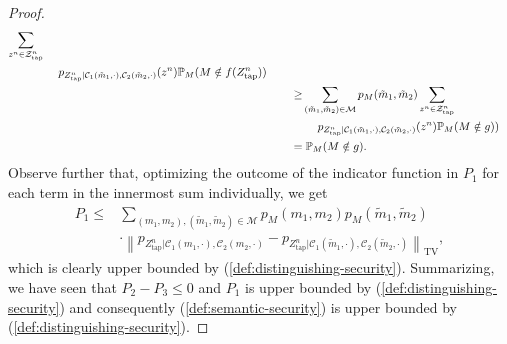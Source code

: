 \documentclass[journal]{IEEEtran}
\newcommand{\codebookpmf}{p}
\newcommand{\channelOut}{Z}
\newcommand{\channelOutAlph}{\mathcal{Z}}
\newcommand{\channelOutAlphElement}{z}
\newcommand{\channelOutAlphWiretapper}{\channelOutAlph_\mathrm{tap}}
\newcommand{\channelOutAlphElementWiretapper}{\channelOutAlphElement}
\newcommand{\channelOutWiretapper}{\channelOut_\mathrm{tap}}
\newcommand{\codebookOne}{\mathcal{C}_1}
\newcommand{\codebookTwo}{\mathcal{C}_2}
\newcommand{\codebookBlocklength}{n}
\newcommand{\totalvariationlr}[1]{\left\lVert #1 \right\rVert_\mathrm{TV}}
\newcommand{\Probability}{\mathbb{P}}
\newcommand{\messageRV}{M}
\newcommand{\messageAlphabet}{\mathcal{M}}
\newcommand{\messageAlphabetElement}{m}
\newcommand{\wiretapperDecoder}{{f}}
\newcommand{\wiretapperGuesser}{{g}}
\newcommand{\semanticTotvarTerm}{{P_1}}
\newcommand{\semanticErrorTermOne}{{P_2}}
\newcommand{\semanticErrorTermTwo}{{P_3}}
\begin{document}
\begin{proof}
\begin{align*}
\begin{aligned}
  \sum\limits_{\channelOutAlphElementWiretapper^\codebookBlocklength \in \channelOutAlphWiretapper^\codebookBlocklength}
  \\
    &~~~~\codebookpmf_{\channelOutWiretapper^\codebookBlocklength | \codebookOne(\tilde{\messageAlphabetElement}_1, \cdot), \codebookTwo(\tilde{\messageAlphabetElement}_2, \cdot)}(\channelOutAlphElementWiretapper^\codebookBlocklength)
    \Probability_\messageRV(\messageRV \notin \wiretapperDecoder(\channelOutWiretapper^\codebookBlocklength))
\end{aligned}
\\
&
\begin{aligned}
\hphantom{\semanticErrorTermTwo}
\geq
&\sum\limits_{(\tilde{\messageAlphabetElement}_1, \tilde{\messageAlphabetElement}_2) \in \messageAlphabet}
  \codebookpmf_\messageRV(\tilde{\messageAlphabetElement}_1, \tilde{\messageAlphabetElement}_2)
  \sum\limits_{\channelOutAlphElementWiretapper^\codebookBlocklength \in \channelOutAlphWiretapper^\codebookBlocklength}
  \\
    &~~~~\codebookpmf_{\channelOutWiretapper^\codebookBlocklength | \codebookOne(\tilde{\messageAlphabetElement}_1, \cdot), \codebookTwo(\tilde{\messageAlphabetElement}_2, \cdot)}(\channelOutAlphElementWiretapper^\codebookBlocklength)
    \Probability_\messageRV(\messageRV \notin \wiretapperGuesser))
\end{aligned}
\\
&
\begin{aligned}
\hphantom{\semanticErrorTermTwo}
=
\Probability_\messageRV(\messageRV \notin \wiretapperGuesser).
\end{aligned}
\end{align*}
Observe further that, optimizing the outcome of the indicator function in $\semanticTotvarTerm$ for each term in the innermost sum individually, we get
\begin{align*}
\semanticTotvarTerm
\leq 
&\sum\limits_{(\messageAlphabetElement_1, \messageAlphabetElement_2), (\tilde{\messageAlphabetElement}_1, \tilde{\messageAlphabetElement}_2) \in \messageAlphabet}
\codebookpmf_\messageRV(\messageAlphabetElement_1, \messageAlphabetElement_2)
\codebookpmf_\messageRV(\tilde{\messageAlphabetElement}_1, \tilde{\messageAlphabetElement}_2)
\\
&\cdot \totalvariationlr{
  \codebookpmf_{\channelOutWiretapper^\codebookBlocklength | \codebookOne(\messageAlphabetElement_1, \cdot), \codebookTwo(\messageAlphabetElement_2, \cdot)}
  -
  \codebookpmf_{\channelOutWiretapper^\codebookBlocklength | \codebookOne(\tilde{\messageAlphabetElement}_1, \cdot), \codebookTwo(\tilde{\messageAlphabetElement}_2, \cdot)}
},
\end{align*}
which is clearly upper bounded by (\ref{def:distinguishing-security}). Summarizing, we have seen that $\semanticErrorTermOne-\semanticErrorTermTwo \leq 0$ and $\semanticTotvarTerm$ is upper bounded by (\ref{def:distinguishing-security}) and consequently (\ref{def:semantic-security}) is upper bounded by (\ref{def:distinguishing-security}).
\end{proof}
\end{document}
